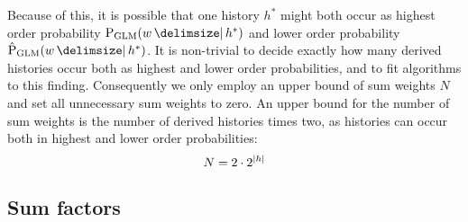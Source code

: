 Because of this, it is possible that one history $h^*$ might both occur as
highest order probability $\ProbGLM{w}{h^*}$ and lower order probability
$\ProbGLM*{w}{h^*}$.
It is non-trivial to decide exactly how many derived histories occur both as
highest and lower order probabilities, and to fit algorithms to this finding.
Consequently we only employ an upper bound of sum weights $N$ and set all
unnecessary sum weights to zero.
An upper bound for the number of sum weights is the number of derived histories
times two, as histories can occur both in highest and lower order probabilities:
\begin{equation}
  N = 2 \cdot 2^{\left|h\right|}
\end{equation}


\subsection{Sum factors}

